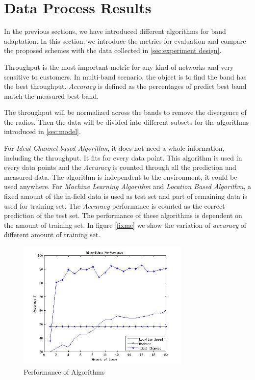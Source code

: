 \section{Data Process Results}
\label{sec:data process}

In the previous sections, we have introduced different algorithms for band adaptation. 
In this section, we introduce the metrics for evaluation and compare the proposed schemes with the data collected in
\ref{sec:experiment design}.

Throughput is the most important metric for any kind of networks and very sensitive to customers. In multi-band scenario, the object is to find the band has the best throughput.  
\emph{Accuracy} is defined as the percentages of predict best band match the measured best band.

The throughput will be normalized across the bands to remove the divergence of the radios. Then the data will be divided into different subsets for the algorithms introduced in 
\ref{sec:model}.

For \emph{Ideal Channel based Algorithm}, it does not need a whole information, including the throughput. It fits for every data point.
This algorithm is used in every data points and the \emph{Accuracy} is counted through all the prediction and measured data. The algorithm is independent to the environment, it could be used anywhere.
For \emph{Machine Learning Algorithm} and \emph{Location Based Algorithm}, a fixed amount of the in-field data is used as test set and part of remaining data is used for training set. The \emph{Accuracy} performance is counted as the correct prediction of the test set. 
The performance of these algorithms is dependent on the amount of training set. In figure \ref{fixme} we show the variation of \emph{accuracy} of different amount of training set.



\begin{figure}
\centering
\includegraphics[width=85mm]{figure/performance_al}
\caption{Performance of Algorithms}
\label{fig:performance}
\end{figure}


